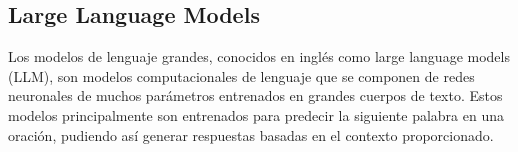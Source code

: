 \subsection{Large Language Models}
Los modelos de lenguaje grandes, conocidos en inglés como large language models (LLM), son modelos computacionales de lenguaje que se componen de redes neuronales de muchos parámetros entrenados en grandes cuerpos de texto. Estos modelos principalmente son entrenados para predecir la siguiente palabra en una oración, pudiendo así generar respuestas basadas en el contexto proporcionado.